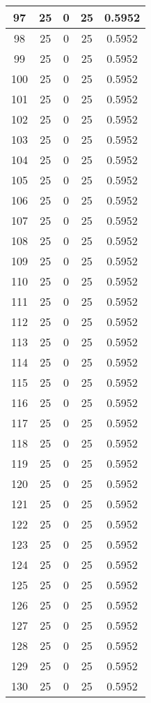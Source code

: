 \documentclass[letterpaper, 12pt]{article}
\begin{document}
\begin{longtable}{|c|c|c|c|c|}
\hline
97 & 25 & 0 & 25 & 0.5952 \\
\hline
98 & 25 & 0 & 25 & 0.5952 \\
\hline
99 & 25 & 0 & 25 & 0.5952 \\
\hline
100 & 25 & 0 & 25 & 0.5952 \\
\hline
101 & 25 & 0 & 25 & 0.5952 \\
\hline
102 & 25 & 0 & 25 & 0.5952 \\
\hline
103 & 25 & 0 & 25 & 0.5952 \\
\hline
104 & 25 & 0 & 25 & 0.5952 \\
\hline
105 & 25 & 0 & 25 & 0.5952 \\
\hline
106 & 25 & 0 & 25 & 0.5952 \\
\hline
107 & 25 & 0 & 25 & 0.5952 \\
\hline
108 & 25 & 0 & 25 & 0.5952 \\
\hline
109 & 25 & 0 & 25 & 0.5952 \\
\hline
110 & 25 & 0 & 25 & 0.5952 \\
\hline
111 & 25 & 0 & 25 & 0.5952 \\
\hline
112 & 25 & 0 & 25 & 0.5952 \\
\hline
113 & 25 & 0 & 25 & 0.5952 \\
\hline
114 & 25 & 0 & 25 & 0.5952 \\
\hline
115 & 25 & 0 & 25 & 0.5952 \\
\hline
116 & 25 & 0 & 25 & 0.5952 \\
\hline
117 & 25 & 0 & 25 & 0.5952 \\
\hline
118 & 25 & 0 & 25 & 0.5952 \\
\hline
119 & 25 & 0 & 25 & 0.5952 \\
\hline
120 & 25 & 0 & 25 & 0.5952 \\
\hline
121 & 25 & 0 & 25 & 0.5952 \\
\hline
122 & 25 & 0 & 25 & 0.5952 \\
\hline
123 & 25 & 0 & 25 & 0.5952 \\
\hline
124 & 25 & 0 & 25 & 0.5952 \\
\hline
125 & 25 & 0 & 25 & 0.5952 \\
\hline
126 & 25 & 0 & 25 & 0.5952 \\
\hline
127 & 25 & 0 & 25 & 0.5952 \\
\hline
128 & 25 & 0 & 25 & 0.5952 \\
\hline
129 & 25 & 0 & 25 & 0.5952 \\
\hline
130 & 25 & 0 & 25 & 0.5952 \\

\end{longtable}
\end{document}
